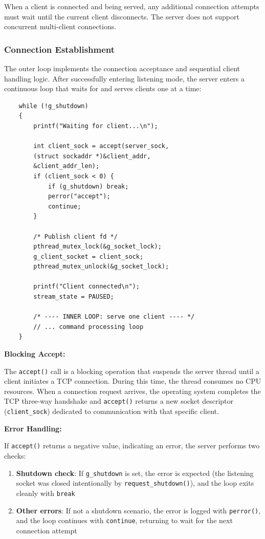 When a client is connected and being served, any additional connection attempts must wait until the current client disconnects. The server does not support concurrent multi-client connections.

\subsubsection{Connection Establishment}

The outer loop implements the connection acceptance and sequential client handling logic. After successfully entering listening mode, the server enters a continuous loop that waits for and serves clients one at a time:

\begin{verbatim}
	while (!g_shutdown)
	{
		printf("Waiting for client...\n");
		
		int client_sock = accept(server_sock,
		(struct sockaddr *)&client_addr,
		&client_addr_len);
		if (client_sock < 0) {
			if (g_shutdown) break;
			perror("accept");
			continue;
		}
		
		/* Publish client fd */
		pthread_mutex_lock(&g_socket_lock);
		g_client_socket = client_sock;
		pthread_mutex_unlock(&g_socket_lock);
		
		printf("Client connected\n");
		stream_state = PAUSED;
		
		/* ---- INNER LOOP: serve one client ---- */
		// ... command processing loop
	}
\end{verbatim}

\textbf{Blocking Accept:}

The \texttt{accept()} call is a blocking operation that suspends the server thread until a client initiates a TCP connection. During this time, the thread consumes no CPU resources. When a connection request arrives, the operating system completes the TCP three-way handshake and \texttt{accept()} returns a new socket descriptor (\texttt{client\_sock}) dedicated to communication with that specific client.

\textbf{Error Handling:}

If \texttt{accept()} returns a negative value, indicating an error, the server performs two checks:

\begin{enumerate}
	\item \textbf{Shutdown check}: If \texttt{g\_shutdown} is set, the error is expected (the listening socket was closed intentionally by \texttt{request\_shutdown()}), and the loop exits cleanly with \texttt{break}
	\item \textbf{Other errors}: If not a shutdown scenario, the error is logged with \texttt{perror()}, and the loop continues with \texttt{continue}, returning to wait for the next connection attempt
\end{enumerate}

